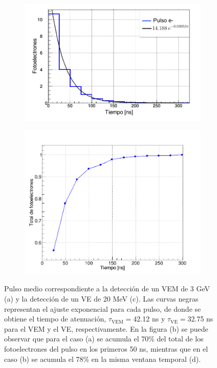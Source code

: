 \documentclass[12pt,oneside,openany,letter]{book}
\begin{document}
\begin{figure}[h!]
\begin{subfigure}{0.45\textwidth}
        \includegraphics[width=\textwidth]{vee_tiempo.png}
        \caption{}
        \label{vee_tiempo}
    \end{subfigure}
     \begin{subfigure}{0.4\textwidth}
        \includegraphics[width=\textwidth]{VEEcum.png}
        \caption{}
        \label{VEEcum}
    \end{subfigure}
    \caption[Pulso medio correspondiente a la detección de un VEM de 3 GeV y la detección de un VE de 20 MeV]{Pulso medio correspondiente a la detección de un VEM de 3 GeV (a) y la detección de un VE de 20 MeV (c). Las curvas negras representan el ajuste exponencial para cada pulso, de donde se obtiene el tiempo de atenuación, $\tau_{\mathrm{VEM}}=$42.12 ns y $\tau_{\mathrm{VE}}=$32.75 ns para el VEM y el VE, respectivamente. En la figura (b) se puede observar que para el caso (a) se acumula el 70\% del total de los fotoelectrones del pulso en los primeros 50 ns, mientras que en el caso (b) se acumula el 78\% en la misma ventana temporal (d).}\label{Pulsos_mu_e}
\end{figure}
\end{document}

